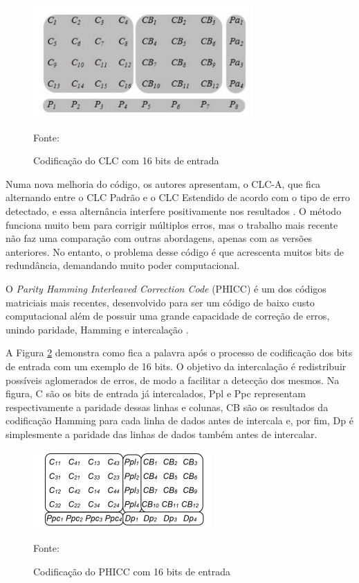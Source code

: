 \begin{figure}[ht]
    \centering
    \includegraphics[scale=1]{figuras/clc.PNG}
    \caption{Codificação do CLC com 16 bits de entrada}{Fonte: \cite{castro2016correction}}
    \label{fig:clc}
\end{figure}

Numa nova melhoria do código, os autores  apresentam, o CLC-A, que fica alternando entre o CLC Padrão e o CLC Estendido de acordo com o tipo de erro detectado, e essa alternância interfere positivamente nos resultados \cite{silva2020clc}. O método funciona muito bem para corrigir múltiplos erros, mas o trabalho mais recente não faz uma comparação com outras abordagens, apenas com as versões anteriores. No entanto, o problema desse código é que acrescenta muitos bits de redundância, demandando muito poder computacional.

O \textit{Parity Hamming Interleaved Correction Code} (PHICC) é um dos códigos matriciais mais recentes, desenvolvido para ser um código de baixo custo computacional além de possuir uma grande capacidade de correção de erros, unindo paridade, Hamming e intercalação \cite{magalhaes2019phicc}.

A Figura \ref{fig:phicc} demonstra como fica a palavra após o processo de codificação dos bits de entrada com um exemplo de 16 bits. O objetivo da intercalação é redistribuir possíveis aglomerados de erros, de modo a facilitar a detecção dos mesmos. Na figura, C são os bits de entrada já intercalados, Ppl e Ppc representam respectivamente a paridade dessas linhas e colunas, CB são os resultados da codificação Hamming para cada linha de dados antes de intercala e, por fim, Dp é simplesmente a paridade das linhas de dados também antes de intercalar. 

\begin{figure}[ht]
    \centering
    \includegraphics[scale=1]{figuras/phicc.PNG}
    \caption{Codificação do PHICC com 16 bits de entrada}{Fonte: \cite{magalhaes2019phicc}}
    \label{fig:phicc}
\end{figure}

